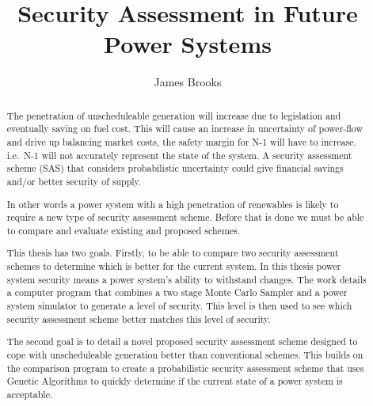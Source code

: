 \documentclass[a4paper,oneside,12pt]{report}
\newcommand{\frontmatter}{\cleardoublepage\pagenumbering{roman}}
\begin{document}
\frontmatter

\norestrictions
\author{James Brooks}
\title{Security Assessment in Future Power Systems}

\maketitle

\begin{abstract}


The penetration of unscheduleable generation will increase due to legislation and eventually saving on fuel cost. This will cause an increase in uncertainty of power-flow and drive up balancing market costs, the safety margin for N-1 will have to increase. i.e.\ N-1 will not accurately represent the state of the system. A security assessment scheme (SAS) that considers probabilistic uncertainty could give financial savings and/or better security of supply.


In other words a power system with a high penetration of renewables is likely to require a new type of security assessment scheme. Before that is done we must be able to compare and evaluate existing and proposed schemes.


This thesis has two goals. Firstly, to be able to compare two security assessment schemes to determine which is better for the current system. In this thesis power system security means a power system's ability to withstand changes. The work details a computer program that combines a two stage Monte Carlo Sampler and a power system simulator to generate a level of security. This level is then used to see which security assessment scheme better matches this level of security.


The second goal is to detail a novel proposed security assessment scheme designed to cope with unscheduleable generation better than conventional schemes. This builds on the comparison program to create a probabilistic security assessment scheme that uses Genetic Algorithms to quickly determine if the current state of a power system is acceptable.


\end{abstract}


\tableofcontents
\listoffigures
\listoftables
\end{document}
